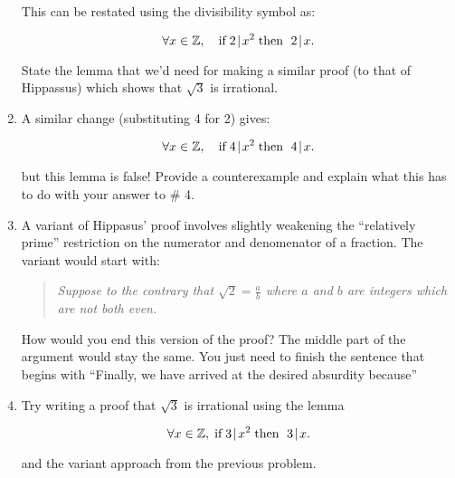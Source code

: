 \documentclass{amsart}
\begin{document}
\begin{enumerate}
This can be restated using the divisibility symbol as:

\[ \forall x \in {\mathbb Z}, \quad \mbox{if} \; 2 \!\mid\! x^2 \; \mbox{then } \; 2\!\mid\! x. \]

State the lemma that we'd need for making a similar proof (to that of Hippassus) which shows that  $\sqrt{3}$ is irrational.

\vfill

\item A similar change (substituting 4 for 2) gives:

\[ \forall x \in {\mathbb Z}, \quad \mbox{if} \; 4 \!\mid\! x^2 \; \mbox{then } \; 4\!\mid\! x. \]

\noindent but this lemma is false!  Provide a counterexample and explain what this has to do with your answer to \# 4.

\vfill

\newpage

\item A variant of Hippasus' proof involves slightly weakening the ``relatively prime'' restriction on the numerator and denomenator of a fraction.  The variant would start with:

\begin{quote} 
{\em Suppose to the contrary that $\displaystyle \sqrt{2} = \frac{a}{b}$ where $a$ and $b$ are integers which are not both even.}
\end{quote}

How would you end this version of the proof? The middle part of the argument would stay the same.  You just need to finish the sentence that begins with ``Finally, we have arrived at the desired absurdity because\textellipsis''

\vfill

\item Try writing a proof that $\sqrt{3}$ is irrational using the lemma 

\[ \forall x \in {\mathbb Z}, \; \mbox{if} \; 3 \!\mid\! x^2 \; \mbox{then } \; 3 \!\mid\! x. \]

\noindent and the variant approach from the previous problem.

\vfill



\end{enumerate}
\end{document}
